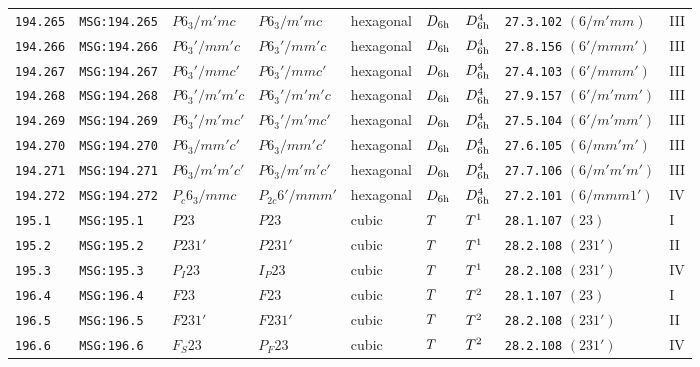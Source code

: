 \documentclass[fleqn,10pt]{jsarticle}
\begin{document}
\begin{center}
\begin{longtable}{lllllllll}
\texttt{194.265} & \texttt{MSG:194.265} & $P6_{3}/m'mc$ & $P6_{3}/m'mc$ & hexagonal & $D_{\rm 6h}$ & $D_{\rm 6h}^{4}$ & \texttt{27.3.102} $(6/m'mm)$ & III \\
\texttt{194.266} & \texttt{MSG:194.266} & $P6_{3}'/mm'c$ & $P6_{3}'/mm'c$ & hexagonal & $D_{\rm 6h}$ & $D_{\rm 6h}^{4}$ & \texttt{27.8.156} $(6'/mmm')$ & III \\
\texttt{194.267} & \texttt{MSG:194.267} & $P6_{3}'/mmc'$ & $P6_{3}'/mmc'$ & hexagonal & $D_{\rm 6h}$ & $D_{\rm 6h}^{4}$ & \texttt{27.4.103} $(6'/mmm')$ & III \\
\texttt{194.268} & \texttt{MSG:194.268} & $P6_{3}'/m'm'c$ & $P6_{3}'/m'm'c$ & hexagonal & $D_{\rm 6h}$ & $D_{\rm 6h}^{4}$ & \texttt{27.9.157} $(6'/m'mm')$ & III \\
\texttt{194.269} & \texttt{MSG:194.269} & $P6_{3}'/m'mc'$ & $P6_{3}'/m'mc'$ & hexagonal & $D_{\rm 6h}$ & $D_{\rm 6h}^{4}$ & \texttt{27.5.104} $(6'/m'mm')$ & III \\
\texttt{194.270} & \texttt{MSG:194.270} & $P6_{3}/mm'c'$ & $P6_{3}/mm'c'$ & hexagonal & $D_{\rm 6h}$ & $D_{\rm 6h}^{4}$ & \texttt{27.6.105} $(6/mm'm')$ & III \\
\texttt{194.271} & \texttt{MSG:194.271} & $P6_{3}/m'm'c'$ & $P6_{3}/m'm'c'$ & hexagonal & $D_{\rm 6h}$ & $D_{\rm 6h}^{4}$ & \texttt{27.7.106} $(6/m'm'm')$ & III \\
\texttt{194.272} & \texttt{MSG:194.272} & $P_{c}6_{3}/mmc$ & $P_{2c}6'/mmm'$ & hexagonal & $D_{\rm 6h}$ & $D_{\rm 6h}^{4}$ & \texttt{27.2.101} $(6/mmm1')$ & IV \\ \hline
\texttt{195.1} & \texttt{MSG:195.1} & $P23$ & $P23$ & cubic & $T_{\rm }$ & $T_{\rm }^{1}$ & \texttt{28.1.107} $(23)$ & I \\
\texttt{195.2} & \texttt{MSG:195.2} & $P231'$ & $P231'$ & cubic & $T_{\rm }$ & $T_{\rm }^{1}$ & \texttt{28.2.108} $(231')$ & II \\
\texttt{195.3} & \texttt{MSG:195.3} & $P_{I}23$ & $I_{P}23$ & cubic & $T_{\rm }$ & $T_{\rm }^{1}$ & \texttt{28.2.108} $(231')$ & IV \\ \hline
\texttt{196.4} & \texttt{MSG:196.4} & $F23$ & $F23$ & cubic & $T_{\rm }$ & $T_{\rm }^{2}$ & \texttt{28.1.107} $(23)$ & I \\
\texttt{196.5} & \texttt{MSG:196.5} & $F231'$ & $F231'$ & cubic & $T_{\rm }$ & $T_{\rm }^{2}$ & \texttt{28.2.108} $(231')$ & II \\
\texttt{196.6} & \texttt{MSG:196.6} & $F_{S}23$ & $P_{F}23$ & cubic & $T_{\rm }$ & $T_{\rm }^{2}$ & \texttt{28.2.108} $(231')$ & IV \\ \hline

\end{longtable}
\end{center}
\end{document}
